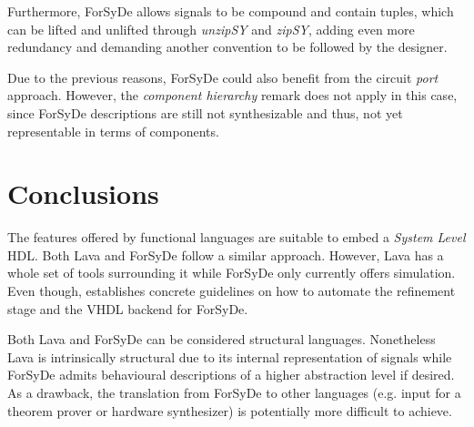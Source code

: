 Furthermore, ForSyDe allows signals to be compound and contain tuples, which
can be lifted and unlifted through \textit{unzipSY} and \textit{zipSY}, adding
even more redundancy and demanding another convention to be followed by the
designer.

Due to the previous reasons, ForSyDe could also benefit from the circuit
\textit{port} approach. However, the \textit{component hierarchy} remark does
not apply in this case, since ForSyDe descriptions are still not synthesizable
and thus, not yet representable in terms of components.

\section{Conclusions}
The features offered by functional languages are suitable to embed a
\textit{System Level} HDL. Both Lava and ForSyDe follow a similar
approach. However, Lava has a whole set of tools surrounding it while
ForSyDe only currently offers simulation. Even though,  \cite{forsyde:thesis}
establishes concrete guidelines on how to automate the refinement
stage and the VHDL backend for ForSyDe.

Both Lava and ForSyDe can be considered structural languages.
Nonetheless Lava is intrinsically structural due to its internal
representation of signals while ForSyDe admits behavioural
descriptions of a higher abstraction level if desired. As a drawback,
the translation from ForSyDe to other languages (e.g. input for a
theorem prover or hardware synthesizer) is potentially more difficult
to achieve.
